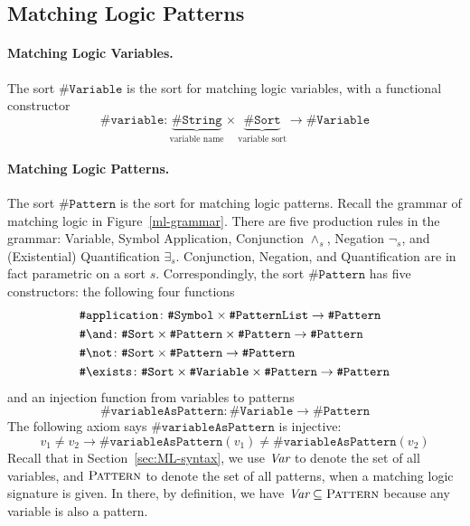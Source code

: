 \documentclass[UTF8,11pt]{article}
\theoremstyle{plain}
\theoremstyle{definition}
\theoremstyle{remark}
\newcommand{\sharpsymbol}{\#}
\newcommand{\KString}{\texttt{\sharpsymbol String}}
\newcommand{\KSort}{\texttt{\sharpsymbol Sort}}
\newcommand{\KSymbol}{\texttt{\sharpsymbol Symbol}}
\newcommand{\KPatternList}{\texttt{\sharpsymbol PatternList}}
\newcommand{\KVariable}{\texttt{\sharpsymbol Variable}}
\newcommand{\KVariableAsKPattern}{\texttt{\sharpsymbol variableAsPattern}}
\newcommand{\KPattern}{\texttt{\sharpsymbol Pattern}}
\newcommand{\Kvariable}{\texttt{\sharpsymbol variable}}
\newcommand{\Kand}{\texttt{\sharpsymbol  \slashsymbol and}}
\newcommand{\Knot}{\texttt{\sharpsymbol  \slashsymbol not}}
\newcommand{\Kapplication}{\texttt{\sharpsymbol application}}
\newcommand{\Kexists}{\texttt{\sharpsymbol \slashsymbol  exists}}
\newcommand{\Pattern}{\textsc{Pattern}\xspace}
\newcommand{\slashsymbol}{\symbol{92}}
\begin{document}
\subsection{Matching Logic Patterns}
\label{sec:ML-patterns}

\paragraph{Matching Logic Variables.}
The sort $\KVariable$ is the sort for 
matching logic variables, with a functional constructor
\begin{equation*}
  \Kvariable \colon \underbrace{\KString}_\text{variable name} \times 
  \underbrace{\KSort}_\text{variable sort} \to \KVariable
\end{equation*}

\paragraph{Matching Logic Patterns.}
The sort $\KPattern$ is the sort for matching logic patterns.
Recall the grammar of matching logic in Figure~\ref{ml-grammar}.
There are five production rules in the grammar: Variable, Symbol Application, 
Conjunction $\wedge_s$, Negation $\neg_s$, and (Existential) Quantification 
$\exists_s$.
Conjunction, Negation, and Quantification are in fact 
parametric on a sort $s$.
Correspondingly, the sort $\KPattern$ has five constructors:
the following four functions
\begin{align*}
  & \Kapplication \colon \KSymbol \times \KPatternList \to \KPattern
  \\
  & \Kand \colon \KSort \times \KPattern \times \KPattern \to \KPattern
  \\
  & \Knot \colon \KSort \times \KPattern \to \KPattern
  \\
  & \Kexists \colon \KSort \times \KVariable \times \KPattern \to \KPattern
\end{align*}
and an injection function from variables to patterns
\begin{equation*}
  \KVariableAsKPattern \colon \KVariable \to \KPattern
\end{equation*}
The following axiom says $\KVariableAsKPattern$ is injective:
$$
v_1 \neq v_2 \to \KVariableAsKPattern(v_1) \neq \KVariableAsKPattern(v_2)
$$
Recall that in Section~\ref{sec:ML-syntax}, we use $\textit{Var}$ to denote the set of all variables, and $\Pattern$ to denote the set of all patterns, when a matching logic signature is given.
In there, by definition, we have $\Var \subseteq \Pattern$ because any variable is also a pattern.
\end{document}
